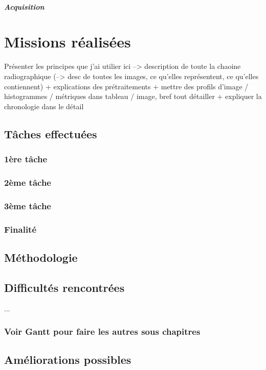 \documentclass[12pt,a4paper]{report}
\begin{document}
\paragraph{Acquisition}


\chapter{Missions réalisées}
Présenter les principes que j'ai utilier ici --> description de toute la chaoine radiographique (--> desc de toutes les images, ce qu'elles représentent, ce qu'elles contiennent) + explications des prétraitements + mettre des profils d'image / histogrammes / métriques dans tableau / image, bref tout détailler  + expliquer la chronologie dans le détail


\section{Tâches effectuées}
\subsection{1ère tâche}
\subsection{2ème tâche}
\subsection{3ème tâche}
\subsection{Finalité}
\section{Méthodologie}
\section{Difficultés rencontrées}
... %
\subsection{Voir Gantt pour faire les autres sous chapitres}
\section{Améliorations possibles}
\end{document}
